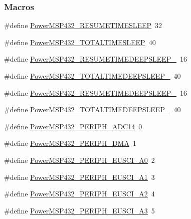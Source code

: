 \subsubsection*{Macros}
\begin{DoxyCompactItemize}
\item 
\#define \hyperlink{_power_m_s_p432_8h_a67cef68228351bd66a984b521d134482}{Power\+M\+S\+P432\+\_\+\+R\+E\+S\+U\+M\+E\+T\+I\+M\+E\+S\+L\+E\+E\+P}~32
\item 
\#define \hyperlink{_power_m_s_p432_8h_af30d58cca0b58bb90cf2b25b23e0f524}{Power\+M\+S\+P432\+\_\+\+T\+O\+T\+A\+L\+T\+I\+M\+E\+S\+L\+E\+E\+P}~40
\item 
\#define \hyperlink{_power_m_s_p432_8h_ac16c9d5bec920e47debddfee08948649}{Power\+M\+S\+P432\+\_\+\+R\+E\+S\+U\+M\+E\+T\+I\+M\+E\+D\+E\+E\+P\+S\+L\+E\+E\+P\+\_}~16
\item 
\#define \hyperlink{_power_m_s_p432_8h_aa1582f30fea8cc7878931f3b7a87e42f}{Power\+M\+S\+P432\+\_\+\+T\+O\+T\+A\+L\+T\+I\+M\+E\+D\+E\+E\+P\+S\+L\+E\+E\+P\+\_}~40
\item 
\#define \hyperlink{_power_m_s_p432_8h_a8b947566f38d4fcab3d31c2eded8615e}{Power\+M\+S\+P432\+\_\+\+R\+E\+S\+U\+M\+E\+T\+I\+M\+E\+D\+E\+E\+P\+S\+L\+E\+E\+P\+\_}~16
\item 
\#define \hyperlink{_power_m_s_p432_8h_abf0029d42c85366abf63987c373cdac1}{Power\+M\+S\+P432\+\_\+\+T\+O\+T\+A\+L\+T\+I\+M\+E\+D\+E\+E\+P\+S\+L\+E\+E\+P\+\_}~40
\item 
\#define \hyperlink{_power_m_s_p432_8h_a5cf5b312e967e3000fdeb326f8e7d248}{Power\+M\+S\+P432\+\_\+\+P\+E\+R\+I\+P\+H\+\_\+\+A\+D\+C14}~0
\item 
\#define \hyperlink{_power_m_s_p432_8h_af0e8ee7327ff60beea1862df54d12f80}{Power\+M\+S\+P432\+\_\+\+P\+E\+R\+I\+P\+H\+\_\+\+D\+M\+A}~1
\item 
\#define \hyperlink{_power_m_s_p432_8h_a2995cb3826a44e0031a64c925d53c7f6}{Power\+M\+S\+P432\+\_\+\+P\+E\+R\+I\+P\+H\+\_\+\+E\+U\+S\+C\+I\+\_\+\+A0}~2
\item 
\#define \hyperlink{_power_m_s_p432_8h_acad1bb0ac04b7902d441ebb4ca33f404}{Power\+M\+S\+P432\+\_\+\+P\+E\+R\+I\+P\+H\+\_\+\+E\+U\+S\+C\+I\+\_\+\+A1}~3
\item 
\#define \hyperlink{_power_m_s_p432_8h_a619876e9f58fb8f52839e6ad73559d78}{Power\+M\+S\+P432\+\_\+\+P\+E\+R\+I\+P\+H\+\_\+\+E\+U\+S\+C\+I\+\_\+\+A2}~4
\item 
\#define \hyperlink{_power_m_s_p432_8h_ad2b24203ad6defb7b6e398cc7f63e3ce}{Power\+M\+S\+P432\+\_\+\+P\+E\+R\+I\+P\+H\+\_\+\+E\+U\+S\+C\+I\+\_\+\+A3}~5

\end{DoxyCompactItemize}
